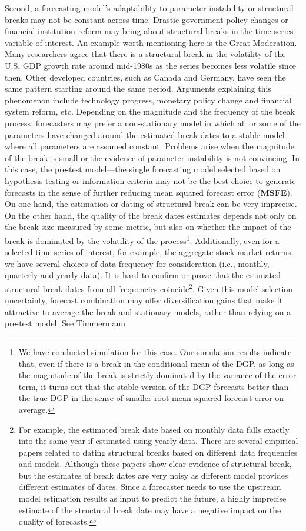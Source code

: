 Second, a forecasting model's adaptability to parameter instability or structural breaks may not be constant across time. Drastic government policy changes or financial institution reform may bring about structural breaks in the time series variable of interest. An example worth mentioning here is the Great Moderation. Many researchers \cite{Stock_Watson_JEL2003} \cite{Stock_DEECON2004} agree that there is a structural break in the volatility of the U.S. GDP growth rate around mid-1980s as the series becomes less volatile since then. Other developed countries, such as Canada and Germany, have seen the same pattern starting around the same period. Arguments explaining this phenomenon include technology progress, monetary policy change and financial system reform, etc. Depending on the magnitude and the frequency of the break process, forecasters may prefer a non-stationary model in which all or some of the parameters have changed around the estimated break dates to a stable model where all parameters are assumed constant. Problems arise when the magnitude of the break is small or the evidence of parameter instability is not convincing. In this case, the pre-test model---the single forecasting model selected based on hypothesis testing or information criteria may not be the best choice to generate forecasts in the sense of further reducing mean squared forecast error (\textbf{MSFE}). On one hand, the estimation or dating of structural break can be very imprecise. On the other hand, the quality of the break dates estimates depends not only on the break size measured by some metric, but also on whether the impact of the break is dominated by the volatility of the process\footnote{We have conducted simulation for this case. Our simulation results indicate that, even if there is a break in the conditional mean of the DGP, as long as the magnitude of the break is strictly dominated by the variance of the error term, it turns out that the stable version of the DGP forecasts better than the true DGP in the sense of smaller root mean squared forecast error on average.}. Additionally, even for a selected time series of interest, for example, the aggregate stock market returns, we have several choices of data frequency for consideration (i.e., monthly, quarterly and yearly data). It is hard to confirm or prove that the estimated structural break dates from all frequencies coincide\footnote{For example, the estimated break date based on monthly data falls exactly into the same year if estimated using yearly data. There are several empirical papers \cite{rapach_wohar_JFE2006} \cite{paye_timmermann_JEF2006} related to dating structural breaks based on different data frequencies and models. Although these papers show clear evidence of structural break, but the estimates of break dates are very noisy as different model provides different estimates of dates. Since a forecaster needs to use the upstream model estimation results as input to predict the future, a highly imprecise estimate of the structural break date may have a negative impact on the quality of forecasts.}. Given this model selection uncertainty, forecast combination may offer diversification gains that make it attractive to average the break and stationary models, rather than relying on a pre-test model. See Timmermann 